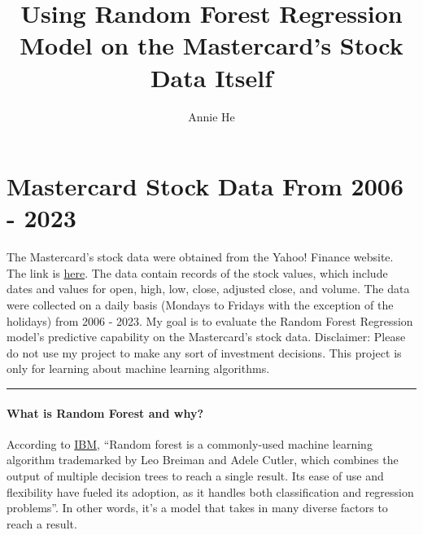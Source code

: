 \documentclass[11pt]{article}
\title{Using Random Forest Regression Model on the Mastercard's Stock Data Itself}
\author{Annie He}
\begin{document}
    
    \maketitle
    
    

    
    \hypertarget{mastercard-stock-data-from-2006---2023}{%
\section{Mastercard Stock Data From 2006 -
2023}\label{mastercard-stock-data-from-2006---2023}}

The Mastercard's stock data were obtained from the Yahoo! Finance
website. The link is
\href{https://finance.yahoo.com/quote/MA/history?period1=1148515200\&period2=1680652800\&interval=1d\&filter=history\&frequency=1d\&includeAdjustedClose=true}{here}.
The data contain records of the stock values, which include dates and
values for open, high, low, close, adjusted close, and volume. The data
were collected on a daily basis (Mondays to Fridays with the exception
of the holidays) from 2006 - 2023. My goal is to evaluate the Random
Forest Regression model's predictive capability on the Mastercard's
stock data. Disclaimer: Please do not use my project to make any sort of
investment decisions. This project is only for learning about machine
learning algorithms.

\begin{center}\rule{0.5\linewidth}{0.5pt}\end{center}

\hypertarget{what-is-random-forest-and-why}{%
\paragraph{What is Random Forest and
why?}\label{what-is-random-forest-and-why}}

According to \href{https://www.ibm.com/topics/random-forest}{IBM},
``Random forest is a commonly-used machine learning algorithm
trademarked by Leo Breiman and Adele Cutler, which combines the output
of multiple decision trees to reach a single result. Its ease of use and
flexibility have fueled its adoption, as it handles both classification
and regression problems''. In other words, it's a model that takes in
many diverse factors to reach a result.
\end{document}
